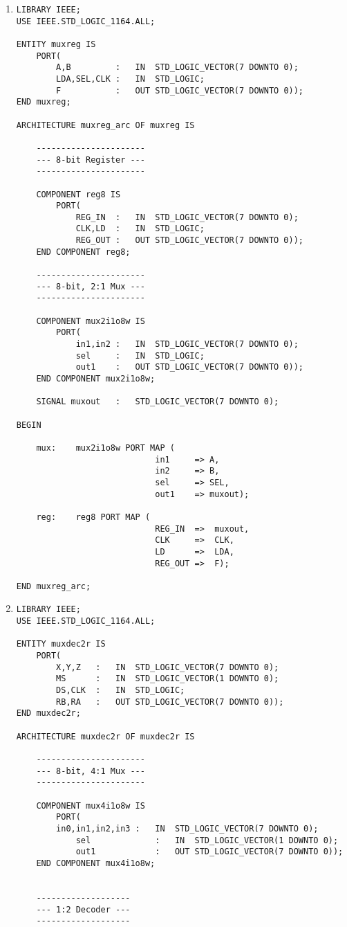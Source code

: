 \begin{enumerate}
	\item \begin{lstlisting}
LIBRARY IEEE;
USE IEEE.STD_LOGIC_1164.ALL;

ENTITY muxreg IS
	PORT(
		A,B			:	IN	STD_LOGIC_VECTOR(7 DOWNTO 0);
		LDA,SEL,CLK	:	IN	STD_LOGIC;
		F			:	OUT	STD_LOGIC_VECTOR(7 DOWNTO 0));
END muxreg;

ARCHITECTURE muxreg_arc OF muxreg IS
	
	----------------------
	--- 8-bit Register ---
	----------------------
	
	COMPONENT reg8 IS
		PORT(
			REG_IN	:	IN	STD_LOGIC_VECTOR(7 DOWNTO 0);
			CLK,LD	:	IN	STD_LOGIC;
			REG_OUT	:	OUT	STD_LOGIC_VECTOR(7 DOWNTO 0));
	END COMPONENT reg8;
	
	----------------------
	--- 8-bit, 2:1 Mux ---
	----------------------
	
	COMPONENT mux2i1o8w IS
		PORT(
			in1,in2	:	IN	STD_LOGIC_VECTOR(7 DOWNTO 0);
			sel		:	IN	STD_LOGIC;
			out1	:	OUT	STD_LOGIC_VECTOR(7 DOWNTO 0));
	END COMPONENT mux2i1o8w;
	
	SIGNAL muxout	:	STD_LOGIC_VECTOR(7 DOWNTO 0);
	
BEGIN
	
	mux:	mux2i1o8w PORT MAP (
							in1		=> A,
							in2		=> B,
							sel		=> SEL,
							out1	=> muxout);
								
	reg:	reg8 PORT MAP (
							REG_IN	=>	muxout,
							CLK		=>	CLK,
							LD		=>	LDA,
							REG_OUT	=>	F);
	
END muxreg_arc;
	\end{lstlisting}
	
	\item \begin{lstlisting}
LIBRARY IEEE;
USE IEEE.STD_LOGIC_1164.ALL;

ENTITY muxdec2r IS
	PORT(
		X,Y,Z	:	IN	STD_LOGIC_VECTOR(7 DOWNTO 0);
		MS		:	IN	STD_LOGIC_VECTOR(1 DOWNTO 0);
		DS,CLK	:	IN	STD_LOGIC;
		RB,RA	:	OUT	STD_LOGIC_VECTOR(7 DOWNTO 0));
END muxdec2r;

ARCHITECTURE muxdec2r OF muxdec2r IS
	
	----------------------
	--- 8-bit, 4:1 Mux ---
	----------------------
	
	COMPONENT mux4i1o8w IS
		PORT(
		in0,in1,in2,in3	:	IN	STD_LOGIC_VECTOR(7 DOWNTO 0);
			sel				:	IN	STD_LOGIC_VECTOR(1 DOWNTO 0);
			out1			:	OUT	STD_LOGIC_VECTOR(7 DOWNTO 0));
	END COMPONENT mux4i1o8w;
	
	
	-------------------
	--- 1:2 Decoder ---
	-------------------
	

\end{lstlisting}
\end{enumerate}
